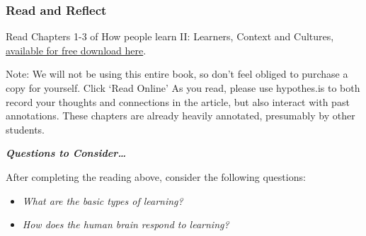 \documentclass[
]{book}
\providecommand{\tightlist}{%
  \setlength{\itemsep}{0pt}\setlength{\parskip}{0pt}}
\begin{document}
\begin{reflect}
\hypertarget{read-and-reflect}{%
\subsubsection*{Read and Reflect}\label{read-and-reflect}}

Read Chapters 1-3 of How people learn II: Learners, Context and Cultures, \href{https://www.nap.edu/catalog/24783}{available for free download here}.

Note: We will not be using this entire book, so don't feel obliged to purchase a copy for yourself.
Click `Read Online' As you read, please use hypothes.is to both record your thoughts and connections in the article, but also interact with past annotations. These chapters are already heavily annotated, presumably by other students.

\textbf{\emph{Questions to Consider\ldots{}}}

After completing the reading above, consider the following questions:

\begin{itemize}
\tightlist
\item
  \emph{What are the basic types of learning?}
\item
  \emph{How does the human brain respond to learning?}
\end{itemize}
\end{reflect}
\end{document}

